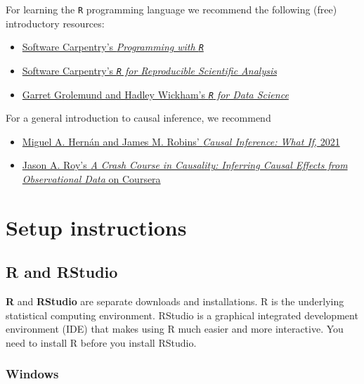 \documentclass[
  12pt, krantz2,
]{krantz}
\newcommand{\passthrough}[1]{#1}
\providecommand{\tightlist}{%
  \setlength{\itemsep}{0pt}\setlength{\parskip}{0pt}}
\newcommand{\1}{\mathbbm{1}}
\theoremstyle{definition}
\theoremstyle{definition}
\theoremstyle{definition}
\theoremstyle{definition}
\theoremstyle{remark}
\begin{document}
For learning the \passthrough{\lstinline!R!} programming language we recommend the following (free)
introductory resources:

\begin{itemize}
\tightlist
\item
  \href{http://swcarpentry.github.io/r-novice-inflammation/}{Software Carpentry's \emph{Programming with
  \passthrough{\lstinline!R!}}}
\item
  \href{http://swcarpentry.github.io/r-novice-gapminder/}{Software Carpentry's \emph{\passthrough{\lstinline!R!} for Reproducible Scientific
  Analysis}}
\item
  \href{https://r4ds.had.co.nz}{Garret Grolemund and Hadley Wickham's \emph{\passthrough{\lstinline!R!} for Data
  Science}}
\end{itemize}

For a general introduction to causal inference, we recommend

\begin{itemize}
\tightlist
\item
  \href{https://www.hsph.harvard.edu/miguel-hernan/causal-inference-book/}{Miguel A. Hernán and James M. Robins' \emph{Causal Inference: What If},
  2021}
\item
  \href{https://www.coursera.org/learn/crash-course-in-causality}{Jason A. Roy's \emph{A Crash Course in Causality: Inferring Causal Effects from
  Observational Data} on
  Coursera}
\end{itemize}

\hypertarget{setup}{%
\section{Setup instructions}\label{setup}}

\hypertarget{r-and-rstudio}{%
\subsection{R and RStudio}\label{r-and-rstudio}}

\textbf{R} and \textbf{RStudio} are separate downloads and installations. R is the
underlying statistical computing environment. RStudio is a graphical integrated
development environment (IDE) that makes using R much easier and more
interactive. You need to install R before you install RStudio.

\hypertarget{windows}{%
\subsubsection{Windows}\label{windows}}
\end{document}

